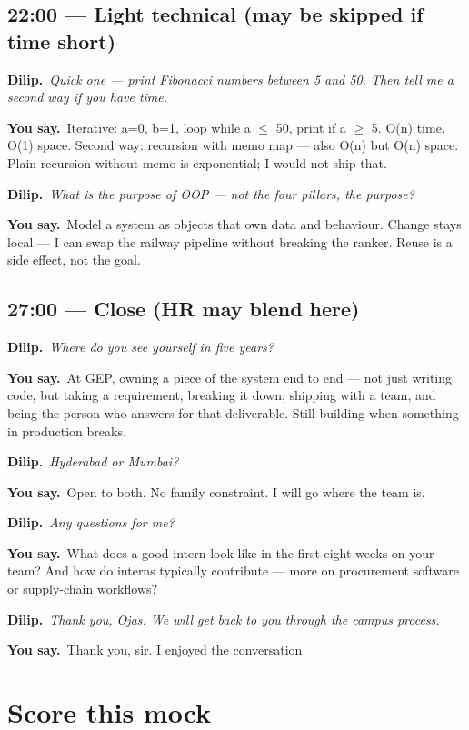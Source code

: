 \documentclass[11pt,a4paper]{article}
\newcommand{\IV}[1]{\par\vspace{4pt}\noindent\textcolor{qcol}{\textbf{Dilip.}}~\textit{#1}\par}
\newcommand{\You}[1]{%
  \par\vspace{2pt}%
  \noindent\colorbox{youbg}{%
    \parbox{\dimexpr\textwidth-2\fboxsep}{\vspace{3pt}\textcolor{you}{\textbf{\small You say.}}~#1\vspace{3pt}}%
  }\par}
\begin{document}
\subsection*{22:00 --- Light technical (may be skipped if time short)}

\IV{Quick one --- print Fibonacci numbers between 5 and 50. Then tell me a second way if you have time.}

\You{Iterative: a=0, b=1, loop while a $\leq$ 50, print if a $\geq$ 5. O(n) time, O(1) space. Second way: recursion with memo map --- also O(n) but O(n) space. Plain recursion without memo is exponential; I would not ship that.}


\IV{What is the purpose of OOP --- not the four pillars, the \emph{purpose}?}

\You{Model a system as objects that own data and behaviour. Change stays local --- I can swap the railway pipeline without breaking the ranker. Reuse is a side effect, not the goal.}

\subsection*{27:00 --- Close (HR may blend here)}

\IV{Where do you see yourself in five years?}

\You{At GEP, owning a piece of the system end to end --- not just writing code, but taking a requirement, breaking it down, shipping with a team, and being the person who answers for that deliverable. Still building when something in production breaks.}

\IV{Hyderabad or Mumbai?}

\You{Open to both. No family constraint. I will go where the team is.}

\IV{Any questions for me?}

\You{What does a good intern look like in the first eight weeks on your team? And how do interns typically contribute --- more on procurement software or supply-chain workflows?}

\IV{Thank you, Ojas. We will get back to you through the campus process.}

\You{Thank you, sir. I enjoyed the conversation.}

\section{Score this mock}
\end{document}
